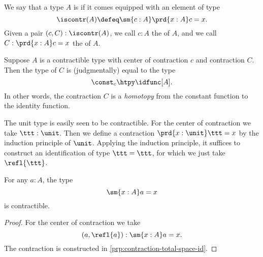 \begin{defn}
  We say that a type $A$ is  if it comes equipped with an element of type
  \begin{equation*}
    \iscontr(A) \defeq \sm{c:A}\prd{x:A}c=x.
  \end{equation*}
  Given a pair $(c,C):\iscontr(A)$, we call $c:A$ the  of $A$, and we call $C:\prd{x:A}c=x$ the  of $A$.
\end{defn}

\begin{rmk}
Suppose $A$ is a contractible type with center of contraction $c$ and contraction $C$. Then the type of $C$ is (judgmentally) equal to the type
\begin{equation*}
\const_c\htpy\idfunc[A].
\end{equation*}
In other words, the contraction $C$ is a \emph{homotopy} from the constant function to the identity function.
\end{rmk}

\begin{eg}
  The unit type is easily seen to be contractible. For the center of contraction we take $\ttt:\unit$. Then we define a contraction $\prd{x:\unit}\ttt=x$ by the induction principle of $\unit$. Applying the induction principle, it suffices to construct an identification of type $\ttt = \ttt$, for which we just take $\refl{\ttt}$.
\end{eg}

\begin{thm}\label{thm:total_path}
For any $a:A$, the type
\begin{equation*}
\sm{x:A}a=x
\end{equation*}
is contractible.
\end{thm}

\begin{proof}
  For the center of contraction we take
  \begin{equation*}
    (a,\refl{a}):\sm{x:A}a=x.
  \end{equation*}
  The contraction is constructed in \cref{prp:contraction-total-space-id}.
\end{proof}

